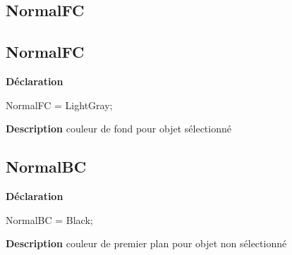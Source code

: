 \documentclass{report}
\newif\ifpdf
\begin{document}
\subsection*{\large{\textbf{NormalFC}}\normalsize\hspace{1ex}\hrulefill}
\else
\subsection*{NormalFC}
\fi
\label{LesMenus-NormalFC}
\begin{list}{}{
\setlength{\itemindent}{0cm}
\setlength{\listparindent}{0cm}
\setlength{\leftmargin}{\evensidemargin}
\addtolength{\leftmargin}{\tmplength}
\settowidth{\labelsep}{X}
\addtolength{\leftmargin}{\labelsep}
\setlength{\labelwidth}{\tmplength}
}
\item[\textbf{Déclaration}\hfill]
\ifpdf
\begin{flushleft}
\fi
\begin{ttfamily}
NormalFC = LightGray;\end{ttfamily}

\ifpdf
\end{flushleft}
\fi

\par
\item[\textbf{Description}]
couleur de fond pour objet sélectionné

\end{list}
\ifpdf
\subsection*{\large{\textbf{NormalBC}}\normalsize\hspace{1ex}\hrulefill}
\else
\subsection*{NormalBC}
\fi
\label{LesMenus-NormalBC}
\begin{list}{}{
\setlength{\itemindent}{0cm}
\setlength{\listparindent}{0cm}
\setlength{\leftmargin}{\evensidemargin}
\addtolength{\leftmargin}{\tmplength}
\settowidth{\labelsep}{X}
\addtolength{\leftmargin}{\labelsep}
\setlength{\labelwidth}{\tmplength}
}
\item[\textbf{Déclaration}\hfill]
\ifpdf
\begin{flushleft}
\fi
\begin{ttfamily}
NormalBC = Black;\end{ttfamily}

\ifpdf
\end{flushleft}
\fi

\par
\item[\textbf{Description}]
couleur de premier plan pour objet non sélectionné

\end{list}
\ifpdf
\end{document}
